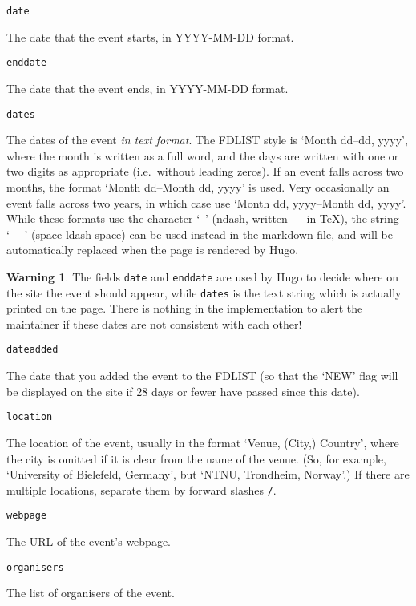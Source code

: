 \documentclass[12pt]{scrartcl}
\theoremstyle{definition}
\newtheorem*{warn}{Warning}
\begin{document}
\noindent\verb|date|\nopagebreak

The date that the event starts, in YYYY-MM-DD format.
\medskip

\noindent\verb|enddate|\nopagebreak

The date that the event ends, in YYYY-MM-DD format.
\medskip

\noindent\verb|dates|\nopagebreak

The dates of the event \emph{in text format}.
The FDLIST style is `Month dd--dd, yyyy', where the month is written as a full word, and the days are written with one or two digits as appropriate (i.e.\ without leading zeros).
If an event falls across two months, the format `Month dd--Month dd, yyyy' is used.
Very occasionally an event falls across two years, in which case use `Month dd, yyyy--Month dd, yyyy'.
While these formats use the character `--' (ndash, written \verb|--| in \TeX), the string `~-~' (space ldash space) can be used instead in the markdown file, and will be automatically replaced when the page is rendered by Hugo.

\begin{warn}
The fields \verb|date| and \verb|enddate| are used by Hugo to decide where on the site the event should appear, while \verb|dates| is the text string which is actually printed on the page.
There is nothing in the implementation to alert the maintainer if these dates are not consistent with each other!
\end{warn}

\noindent\verb|dateadded|\nopagebreak

The date that you added the event to the FDLIST (so that the `NEW' flag will be displayed on the site if 28 days or fewer have passed since this date).
\medskip

\noindent\verb|location|\nopagebreak

The location of the event, usually in the format `Venue, (City,) Country', where the city is omitted if it is clear from the name of the venue.
(So, for example, `University of Bielefeld, Germany', but `NTNU, Trondheim, Norway'.)
If there are multiple locations, separate them by forward slashes \texttt{/}.
\medskip

\noindent\verb|webpage|\nopagebreak

The URL of the event's webpage.
\medskip

\noindent\verb|organisers|\nopagebreak

The list of organisers of the event.
\medskip
\end{document}
